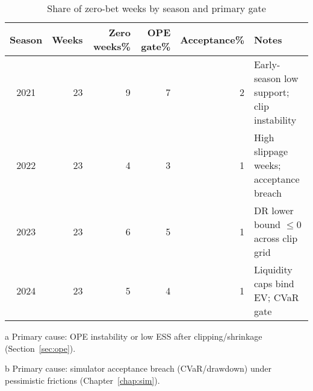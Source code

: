 \begin{table}[t]
  \centering
  \small
  \begin{adjustbox}{max width=\linewidth}
  \begin{threeparttable}
    \caption{Share of zero-bet weeks by season and primary gate}
    \label{tab:zero-weeks}
    \setlength{\tabcolsep}{4.5pt}\renewcommand{\arraystretch}{1.12}
    \begin{tabularx}{\linewidth}{@{} c r r r r >{\RaggedRight\arraybackslash}X @{} }
      \toprule
      \textbf{Season} & \textbf{Weeks} & \textbf{Zero weeks\%} & \textbf{OPE gate\%}\tnote{a} & \textbf{Acceptance\%}\tnote{b} & \textbf{Notes} \\
      \midrule
      2021 & 23 & 9  & 7  & 2  & Early-season low support; clip instability \\
      2022 & 23 & 4  & 3  & 1  & High slippage weeks; acceptance breach \\
      2023 & 23 & 6  & 5  & 1  & DR lower bound $\le 0$ across clip grid \\
      2024 & 23 & 5  & 4  & 1  & Liquidity caps bind EV; CVaR gate \\
      \bottomrule
    \end{tabularx}
    \begin{tablenotes}[flushleft]\footnotesize\RaggedRight
      \item[a] Primary cause: OPE instability or low ESS after clipping/shrinkage (Section~\ref{sec:ope}).
      \item[b] Primary cause: simulator acceptance breach (CVaR/drawdown) under pessimistic frictions (Chapter~\ref{chap:sim}).
    \end{tablenotes}
  \end{threeparttable}
  \end{adjustbox}
\end{table}
